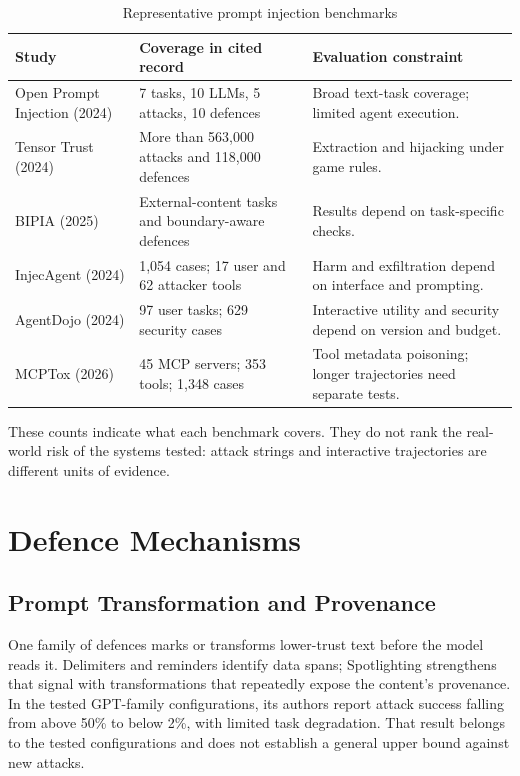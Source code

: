 \documentclass[conference]{IEEEtran}
\begin{document}
\begin{table}[!t]
\caption{Representative prompt injection benchmarks}
\label{tab:1}
\centering
\scriptsize
\renewcommand{\arraystretch}{1.1}
\begin{tabularx}{\columnwidth}{@{}>{\raggedright\arraybackslash}p{}YY@{}}
\hline
Study & Coverage in cited record & Evaluation constraint \\
\hline
Open Prompt Injection \cite{liu2024formalizing} (2024) & 7 tasks, 10 LLMs, 5 attacks, 10 defences & Broad text-task coverage; limited agent execution. \\
Tensor Trust \cite{toyer2024tensor} (2024) & More than 563,000 attacks and 118,000 defences & Extraction and hijacking under game rules. \\
BIPIA \cite{yi2025benchmarking} (2025) & External-content tasks and boundary-aware defences & Results depend on task-specific checks. \\
InjecAgent \cite{zhan2024injecagent} (2024) & 1,054 cases; 17 user and 62 attacker tools & Harm and exfiltration depend on interface and prompting. \\
AgentDojo \cite{debenedetti2024agentdojo} (2024) & 97 user tasks; 629 security cases & Interactive utility and security depend on version and budget. \\
MCPTox \cite{wang2026mcptox} (2026) & 45 MCP servers; 353 tools; 1,348 cases & Tool metadata poisoning; longer trajectories need separate tests. \\
\hline
\end{tabularx}
\end{table}
These counts indicate what each benchmark covers. They do not rank the real-world risk of the systems tested: attack strings and interactive trajectories are different units of evidence.

\section{Defence Mechanisms}
\subsection{Prompt Transformation and Provenance}
One family of defences marks or transforms lower-trust text before the model reads it. Delimiters and reminders identify data spans; Spotlighting \cite{hines2024spotlighting} strengthens that signal with transformations that repeatedly expose the content's provenance. In the tested GPT-family configurations, its authors report attack success falling from above 50\% to below 2\%, with limited task degradation. That result belongs to the tested configurations and does not establish a general upper bound against new attacks.
\end{document}
